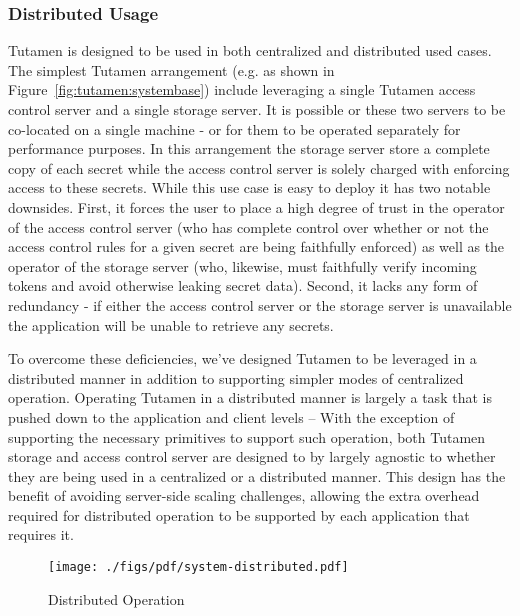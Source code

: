 \subsubsection{Distributed Usage}
\label{sec:tutamen:arch:distributed}

Tutamen is designed to be used in both centralized and distributed
used cases. The simplest Tutamen arrangement (e.g. as shown in
Figure~\ref{fig:tutamen:systembase}) include leveraging a single
Tutamen access control server and a single storage server. It is
possible or these two servers to be co-located on a single machine -
or for them to be operated separately for performance purposes. In
this arrangement the storage server store a complete copy of each
secret while the access control server is solely charged with
enforcing access to these secrets. While this use case is easy to
deploy it has two notable downsides. First, it forces the user to
place a high degree of trust in the operator of the access control
server (who has complete control over whether or not the access
control rules for a given secret are being faithfully enforced) as
well as the operator of the storage server (who, likewise, must
faithfully verify incoming tokens and avoid otherwise leaking secret
data). Second, it lacks any form of redundancy - if either the access
control server or the storage server is unavailable the application
will be unable to retrieve any secrets.

To overcome these deficiencies, we've designed Tutamen to be leveraged
in a distributed manner in addition to supporting simpler modes of
centralized operation. Operating Tutamen in a distributed manner is
largely a task that is pushed down to the application and client
levels -- With the exception of supporting the necessary primitives to
support such operation, both Tutamen storage and access control server
are designed to by largely agnostic to whether they are being used in
a centralized or a distributed manner. This design has the benefit of
avoiding server-side scaling challenges, allowing the extra overhead
required for distributed operation to be supported by each application
that requires it.

\begin{figure}[th]
  \centering
  \texttt{[image: ./figs/pdf/system-distributed.pdf]}
  \caption{Distributed Operation}
  \label{fig:tutamen:systemdistributed}
\end{figure}


